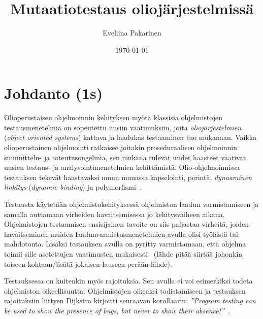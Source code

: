 \documentclass[finnish, grading]{tktltiki2}
\title{Mutaatiotestaus oliojärjestelmissä}
\author{Eveliina Pakarinen}
\date{\today}
\theoremstyle{definition}
\theoremstyle{remark}
\begin{document}

\frontmatter      %

\maketitle        %
\makeabstract     %

\tableofcontents  %


\mainmatter       %




\section{Johdanto (1s)}

Olioperustaisen ohjelmoinnin kehityksen myötä klassisia ohjelmistojen testausmenetelmiä on sopeutettu uusiin vaatimuksiin, joita \textit{oliojärjestelmien} (\textit{object oriented systems}) kattava ja laadukas testaaminen tuo mukanaan. Vaikka olioperustainen ohjelmointi ratkaisee joitakin proseduraalisen ohjelmoinnin suunnittelu- ja toteutusongelmia, sen mukana tulevat uudet haasteet vaativat uusien testaus- ja analysointimenetelmien kehittämistä. Olio-ohjelmoinnissa testauksen tekevät haastavaksi muun muuassa kapselointi, perintä, \textit{dynaaminen linkitys} (\textit{dynamic binding}) ja polymorfismi~\cite[s. 86]{Mariani:Pezze:2008}.

Testausta käytetään ohjelmistokehityksessä ohjelmiston laadun varmistamiseen ja samalla auttamaan virheiden havaitsemisessa jo kehitysvaiheen aikana. Ohjelmistojen testaamisen ensisijainen tavoite on siis paljastaa virheitä, joiden havaitseminen muiden laadunvarmistusmenetelmien avulla olisi työlästä tai mahdotonta. Lisäksi testauksen avulla on pyritty varmistamaan, että ohjelma toimii sille asetettujen vaatimusten mukaisesti~\cite[s. 59]{Binder:1999} (lähde pitää siirtää johonkin toiseen kohtaan/lisätä jokaisen lauseen perään lähde). 

Testauksessa on kuitenkin myös rajoituksia. Sen avulla ei voi esimerkiksi todeta ohjelmiston oikeellisuutta. Ohjelmistojen oikeaksi todistamiseen ja testauksen rajoituksiin liittyen Dijkstra kirjoitti seuraavan korollaarin: \textit{''Program testing can be used to show the presence of bugs, but never to show their absence!''}~\cite[s. 6]{Dahl:Dijkstra:Hoare:1972}. 
\end{document}
